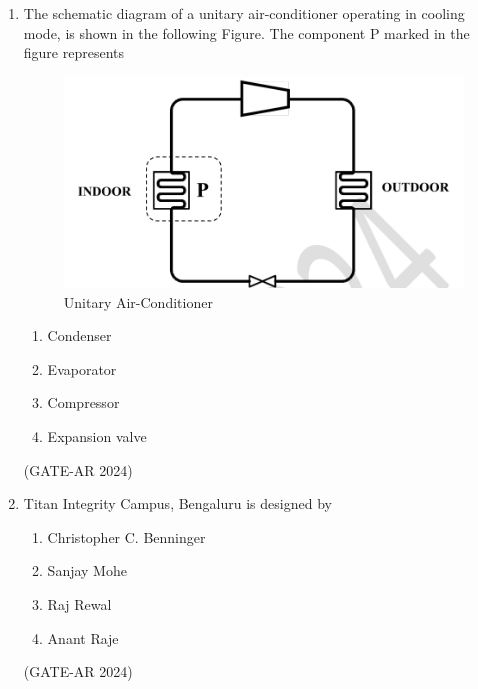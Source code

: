 \documentclass[a4paper,10pt]{article}
\begin{document}
\begin{enumerate}
    \item The schematic diagram of a unitary air-conditioner operating in cooling mode, is shown in the following Figure. The component P marked in the figure represents \\
    \begin{figure}[h!]
    \centering
    \includegraphics[width=0.5\columnwidth]{figs/12.jpg}
    \caption{Unitary Air-Conditioner}
    \label{fig:Img12}
    \end{figure}
    \begin{multicols}{4}
    \begin{enumerate}
        \item Condenser
        \item Evaporator
        \item Compressor
        \item Expansion valve
    \end{enumerate}
    \end{multicols}
    \hfill (GATE-AR 2024)

    \item Titan Integrity Campus, Bengaluru is designed by
    \begin{multicols}{2}
    \begin{enumerate}
        \item Christopher C. Benninger
        \item Sanjay Mohe
        \item Raj Rewal
        \item Anant Raje
    \end{enumerate}
    \end{multicols}
    \hfill (GATE-AR 2024)


\end{enumerate}
\end{document}
